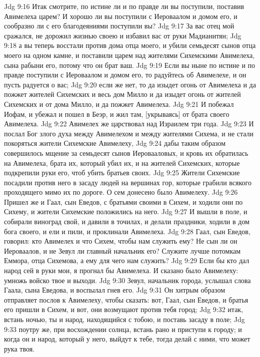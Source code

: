 Jdg 9:16  Итак смотрите, по истине ли и по правде ли вы поступили, поставив Авимелеха царем? И хорошо ли вы поступили с Иероваалом и домом его, и сообразно ли с его благодеяниями поступили вы?
Jdg 9:17  За вас отец мой сражался, не дорожил жизнью своею и избавил вас от руки Мадианитян;
Jdg 9:18  а вы теперь восстали против дома отца моего, и убили семьдесят сынов отца моего на одном камне, и поставили царем над жителями Сихемскими Авимелеха, сына рабыни его, потому что он брат ваш.
Jdg 9:19  Если вы ныне по истине и по правде поступили с Иероваалом и домом его, то радуйтесь об Авимелехе, и он пусть радуется о вас;
Jdg 9:20  если же нет, то да изыдет огонь от Авимелеха и да пожжет жителей Сихемских и весь дом Милло и да изыдет огонь от жителей Сихемских и от дома Милло, и да пожжет Авимелеха.
Jdg 9:21  И побежал Иофам, и убежал и пошел в Беэр, и жил там, [укрываясь] от брата своего Авимелеха.
Jdg 9:22  Авимелех же царствовал над Израилем три года.
Jdg 9:23  И послал Бог злого духа между Авимелехом и между жителями Сихема, и не стали покоряться жители Сихемские Авимелеху,
Jdg 9:24  дабы таким образом совершилось мщение за семьдесят сынов Иеровааловых, и кровь их обратилась на Авимелеха, брата их, который убил их, и на жителей Сихемских, которые подкрепили руки его, чтоб убить братьев своих.
Jdg 9:25  Жители Сихемские посадили против него в засаду людей на вершинах гор, которые грабили всякого проходящего мимо их по дороге. О сем донесено было Авимелеху.
Jdg 9:26  Пришел же и Гаал, сын Еведов, с братьями своими в Сихем, и ходили они по Сихему, и жители Сихемские положились на него.
Jdg 9:27  И вышли в поле, и собирали виноград свой, и давили в точилах, и делали праздники, ходили в дом бога своего, и ели и пили, и проклинали Авимелеха.
Jdg 9:28  Гаал, сын Еведов, говорил: кто Авимелех и что Сихем, чтобы нам служить ему? Не сын ли он Иероваалов, и не Зевул ли главный начальник его? Служите лучше потомкам Еммора, отца Сихемова, а ему для чего нам служить?
Jdg 9:29  Если бы кто дал народ сей в руки мои, я прогнал бы Авимелеха. И сказано было Авимелеху: умножь войско твое и выходи.
Jdg 9:30  Зевул, начальник города, услышал слова Гаала, сына Еведова, и воспылал гнев его.
Jdg 9:31  Он хитрым образом отправляет послов к Авимелеху, чтобы сказать: вот, Гаал, сын Еведов, и братья его пришли в Сихем, и вот, они возмущают против тебя город;
Jdg 9:32  итак, встань ночью, ты и народ, находящийся с тобою, и поставь засаду в поле;
Jdg 9:33  поутру же, при восхождении солнца, встань рано и приступи к городу; и когда он и народ, который у него, выйдут к тебе, тогда делай с ними, что может рука твоя.
